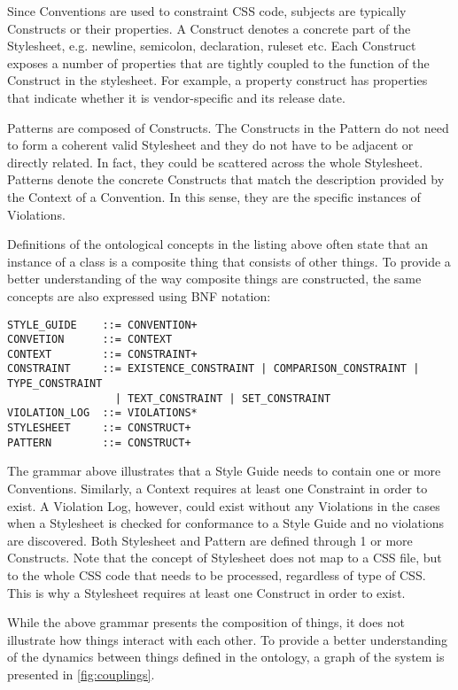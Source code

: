 Since Conventions are used to constraint CSS code, subjects are typically Constructs or their
properties. A Construct denotes a concrete part of the Stylesheet, e.g. newline, semicolon,
declaration, ruleset etc. Each Construct exposes a number of properties that are tightly coupled to
the function of the Construct in the stylesheet. For example, a property construct has properties
that indicate whether it is vendor-specific and its release date.

Patterns are composed of Constructs. The Constructs in the Pattern do not need to form a coherent
valid Stylesheet and they do not have to be adjacent or directly related. In fact, they could be
scattered across the whole Stylesheet. Patterns denote the concrete Constructs that match the
description provided by the Context of a Convention. In this sense, they are the specific instances
of Violations.

Definitions of the ontological concepts in the listing above often state that an instance of a
class is a composite thing that consists of other things. To provide a better understanding of the
way composite things are constructed, the same concepts are also expressed using BNF notation:

\begin{snippet}
\begin{verbatim}
STYLE_GUIDE    ::= CONVENTION+
CONVETION      ::= CONTEXT
CONTEXT        ::= CONSTRAINT+
CONSTRAINT     ::= EXISTENCE_CONSTRAINT | COMPARISON_CONSTRAINT | TYPE_CONSTRAINT  
                 | TEXT_CONSTRAINT | SET_CONSTRAINT
VIOLATION_LOG  ::= VIOLATIONS*
STYLESHEET     ::= CONSTRUCT+
PATTERN        ::= CONSTRUCT+
\end{verbatim}
\end{snippet}

The grammar above illustrates that a Style Guide needs to contain one or more Conventions.
Similarly, a Context requires at least one Constraint in order to exist. A Violation Log, however,
could exist without any Violations in the cases when a Stylesheet is checked for conformance to a
Style Guide and no violations are discovered. Both Stylesheet and Pattern are defined through 1 or
more Constructs. Note that the concept of Stylesheet does not map to a CSS file, but to the whole
CSS code that needs to be processed, regardless of type of CSS. This is why a Stylesheet requires at
least one Construct in order to exist.

While the above grammar presents the composition of things, it does not illustrate how things
interact with each other. To provide a better understanding of the dynamics between things defined
in the ontology, a graph of the system is presented in \autoref{fig:couplings}.

